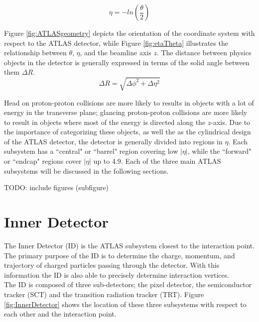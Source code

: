 \begin{equation}
	\eta = -ln(\frac{\theta}{2})
\end{equation}

Figure \ref{fig:ATLASgeometry} depicts the orientation of the coordinate system with respect to the ATLAS detector, while Figure \ref{fig:etaTheta} illustrates the relationship between $\theta$, $\eta$, and the beamline axis $z$. The distance between physics objects in the detector is generally expressed in terms of the solid angle between them $\Delta R$.\\

\begin{equation}
	\Delta R = \sqrt{\Delta\phi^2 + \Delta\eta^2}
\end{equation}

Head on proton-proton collisions are more likely to results in objects with a lot of energy in the transverse plane; glancing proton-proton collisions are more likely to result in objects where most of the energy is directed along the $z$-axis. Due to the importance of categorizing these objects, as well the as the cylindrical design of the ATLAS detector, the detector is generally divided into regions in $\eta$. Each subsystem has a ``central" or ``barrel" region covering low $|\eta|$, while the ``forward" or ``endcap" regions cover $|\eta|$ up to 4.9. Each of the three main ATLAS subsystems will be discussed in the following sections.

TODO: include figures (subfigure)

\section{Inner Detector}

The Inner Detector (ID) is the ATLAS subsystem closest to the interaction point. The primary purpose of the ID is to determine the charge, momentum, and trajectory of charged particles passing through the detector. With this information the ID is also able to precisely determine interaction vertices. \\

The ID is composed of three sub-detectors; the pixel detector, the semiconductor tracker (SCT) and the transition radiation tracker (TRT). Figure \ref{fig:InnerDetector} shows the location of these three subsystems with respect to each other and the interaction point. 


